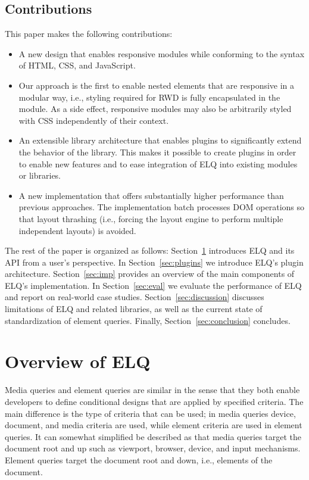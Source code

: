 \documentclass{acm_proc_article-sp}
\newcommand{\elq}{ELQ}
\begin{document}
    \subsection{Contributions}
      This paper makes the following contributions:
      \begin{itemize}
        \item A new design that enables responsive modules while conforming to the syntax of HTML, CSS, and JavaScript.
        \item
          Our approach is the first to enable nested elements that are responsive in a modular way, i.e., styling required for RWD is fully encapsulated in the module.
          As a side effect, responsive modules may also be arbitrarily styled with CSS independently of their context.
        \item
          An extensible library architecture that enables plugins to significantly extend the behavior of the library.
          This makes it possible to create plugins in order to enable new features and to ease integration of \elq{} into existing modules or libraries.
        \item
          A new implementation that offers substantially higher performance than previous approaches.
          The implementation batch processes DOM operations so that layout thrashing (i.e., forcing the layout engine to perform multiple independent layouts) is avoided.
      \end{itemize}

    The rest of the paper is organized as follows:
    Section~\ref{sec:elq} introduces \elq{} and its API from a user's perspective.
    In Section~\ref{sec:plugins} we introduce \elq{}'s plugin architecture.
    Section~\ref{sec:imp} provides an overview of the main components of \elq{}'s implementation.
    In Section~\ref{sec:eval} we evaluate the performance of \elq{} and report on real-world case studies.
    Section~\ref{sec:discussion} discusses limitations of \elq{} and related libraries, as well as the current state of standardization of element queries.
    Finally, Section~\ref{sec:conclusion} concludes.


\section{Overview of \elq{}}\label{sec:elq}
  Media queries and element queries are similar in the sense that they both enable developers to define conditional designs that are applied by specified criteria.
  The main difference is the type of criteria that can be used; in media queries device, document, and media criteria are used, while element criteria are used in element queries.
  It can somewhat simplified be described as that media queries target the document root and up such as viewport, browser, device, and input mechanisms.
  Element queries target the document root and down, i.e., elements of the document.
\end{document}
